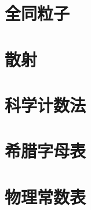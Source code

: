 \documentclass[twoside,b5paper,11pt]{book}
\begin{document}









\chapter{全同粒子}











\chapter{散射}





%


%

%

%

%

%


%

\appendix

\chapter{科学计数法}



\chapter{希腊字母表}


\chapter{物理常数表}



\printindex

\newpage


\end{document}
